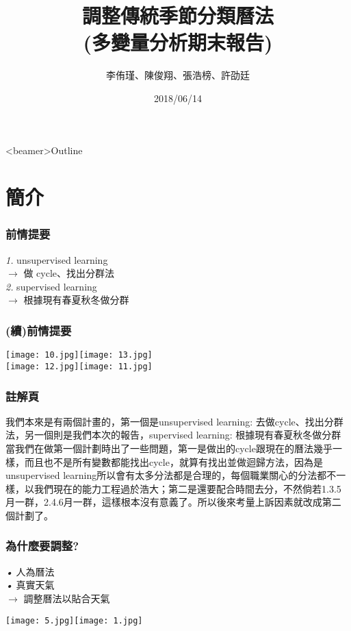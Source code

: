\documentclass{beamer}
\title{調整傳統季節分類曆法 \protect\\ (多變量分析期末報告)}
\author{李侑瑾、陳俊翔、張浩榜、許劭廷}
\institute{國立東華大學 應用數學所統計組}
\date{2018/06/14}
\begin{document}
	\begin{frame}
	\titlepage
\end{frame}
        \begin{frame}<beamer>{Outline}
                \tableofcontents
        \end{frame}
\section{簡介}
\begin{frame}
\frametitle{前情提要}
\emph{1. } unsupervised learning\\
$\rightarrow$ 做 cycle、找出分群法\\
\emph{2. } supervised learning\\
$\rightarrow$ 根據現有春夏秋冬做分群
\end{frame}
\begin{frame}
\frametitle{(續)前情提要}
\texttt{[image: 10.jpg]}\texttt{[image: 13.jpg]}\\
\texttt{[image: 12.jpg]}\texttt{[image: 11.jpg]}
\end{frame}

\begin{frame}
\frametitle{註解頁}
\hspace*{4mm} 我們本來是有兩個計畫的，第一個是unsupervised learning: 去做cycle、找出分群法，另一個則是我們本次的報告，supervised learning: 根據現有春夏秋冬做分群當我們在做第一個計劃時出了一些問題，第一是做出的cycle跟現在的曆法幾乎一樣，而且也不是所有變數都能找出cycle，就算有找出並做迴歸方法，因為是unsupervised learning所以會有太多分法都是合理的，每個職業關心的分法都不一樣，以我們現在的能力工程過於浩大；第二是還要配合時間去分，不然倘若1.3.5月一群，2.4.6月一群，這樣根本沒有意義了。所以後來考量上訴因素就改成第二個計劃了。

\end{frame}



\begin{frame}
\frametitle{為什麼要調整?}
\emph{•} 人為曆法\\
\emph{•} 真實天氣\\
$\rightarrow$ 調整曆法以貼合天氣\\
\begin{center}
\texttt{[image: 5.jpg]}\texttt{[image: 1.jpg]}
\end{center}
\end{frame}
\end{document}
